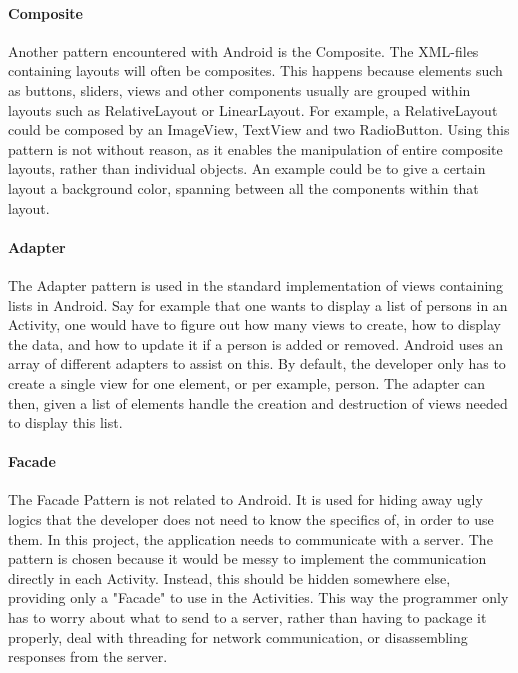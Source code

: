 \paragraph{Composite}
Another pattern encountered with Android is the Composite. The XML-files containing layouts will often be composites. This happens because elements such as buttons, sliders, views and other components usually are grouped within layouts such as RelativeLayout or LinearLayout. For example, a RelativeLayout could be composed by an ImageView, TextView and two RadioButton. Using this pattern is not without reason, as it enables the manipulation of entire composite layouts, rather than individual objects. An example could be to give a certain layout a background color, spanning between all the components within that layout.

\paragraph{Adapter}
The Adapter pattern is used in the standard implementation of views containing lists in Android. Say for example that one wants to display a list of persons in an Activity, one would have to figure out how many views to create, how to display the data, and how to update it if a person is added or removed. Android uses an array of different adapters to assist on this. By default, the developer only has to create a single view for one element, or per example, person. The adapter can then, given a list of elements handle the creation and destruction of views needed to display this list.

\paragraph{Facade}
The Facade Pattern is not related to Android. It is used for hiding away ugly logics that the developer does not need to know the specifics of, in order to use them. In this project, the application needs to communicate with a server. The pattern is chosen because it would be messy to implement the communication directly in each Activity. Instead, this should be hidden somewhere else, providing only a "Facade" to use in the Activities. This way the programmer only has to worry about what to send to a server, rather than having to package it properly, deal with threading for network communication, or disassembling responses from the server.

